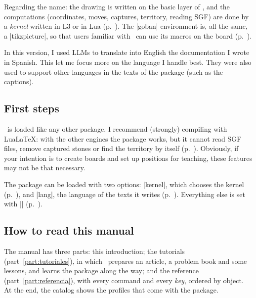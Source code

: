 Regarding the name: the drawing is written on the basic layer of \pgfname, and the computations (coordinates, moves, captures, territory, reading SGF) are done by a \emph{kernel} written in L3 or in Lua (p.~\pageref{subsec:kernel}). The |goban| environment is, all the same, a |tikzpicture|, so that users familiar with \tikzname\ can use its macros on the board (p.~\pageref{sec:tablero}).

In this version, I used LLMs to translate into English the documentation I wrote in Spanish. This let me focus more on the language I handle best. They were also used to support other languages in the texts of the package (such as the captions).

\subsection{First steps}
\label{subsec:primerospasos}

\pgfgoname\ is loaded like any other package. I recommend (strongly) compiling with Lua\LaTeX: with the other engines the package works, but it cannot read SGF files, remove captured stones or find the territory by itself (p.~\pageref{subsec:kernel}). Obviously, if your intention is to create boards and set up positions for teaching, these features may not be that necessary.


The package can be loaded with two options: |kernel|, which chooses the kernel (p.~\pageref{subsec:kernel}), and |lang|, the language of the texts it writes (p.~\pageref{subsec:idiomas}). Everything else is set with |\pgfgoset| (p.~\pageref{sec:configuracion}).

\subsection{How to read this manual}
\label{subsec:guia}

The manual has three parts: this introduction; the tutorials (part~\ref{part:tutoriales}), in which \karu\ prepares an article, a problem book and some lessons, and learns the package along the way; and the reference (part~\ref{part:referencia}), with every command and every \emph{key}, ordered by object. At the end, the catalog shows the profiles that come with the package.

